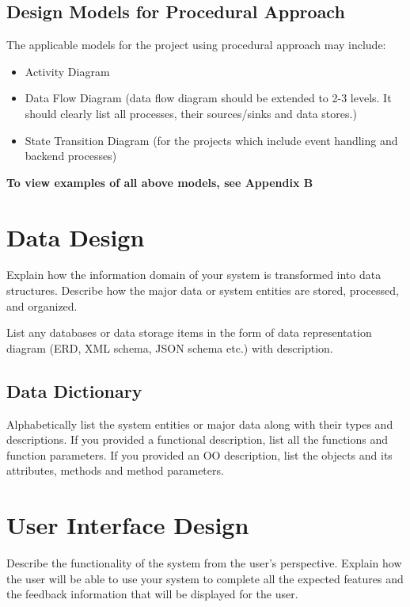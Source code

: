 \documentclass[12pt,a4paper]{report}
\begin{document}
\section*{Design Models for Procedural Approach}

The applicable models for the project using procedural approach may include:

\begin{itemize}
    \item Activity Diagram
    \item Data Flow Diagram (data flow diagram should be extended to 2-3 levels. It should clearly list all processes, their sources/sinks and data stores.)
    \item State Transition Diagram (for the projects which include event handling and backend processes)
\end{itemize}

\textbf{To view examples of all above models, see Appendix B}

\chapter{Data Design}

Explain how the information domain of your system is transformed into data structures. Describe how the major data or system entities are stored, processed, and organized.

List any databases or data storage items in the form of data representation diagram (ERD, XML schema, JSON schema etc.) with description.

\section{Data Dictionary}

Alphabetically list the system entities or major data along with their types and descriptions. If you provided a functional description, list all the functions and function parameters. If you provided an OO description, list the objects and its attributes, methods and method parameters.

\chapter{User Interface Design}

Describe the functionality of the system from the user's perspective. Explain how the user will be able to use your system to complete all the expected features and the feedback information that will be displayed for the user.
\end{document}
